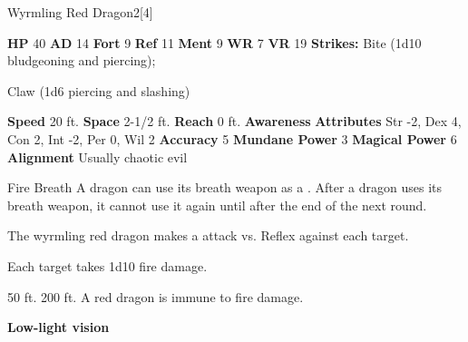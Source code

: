       
  \begin{monsubsection}{Wyrmling Red Dragon}{2}[4]
    \vspace{-1em}\vspace{-1em}
    \vspace{0em}

    
    

    \begin{spellcontent}
      \begin{spelltargetinginfo}
        \pari \textbf{HP} 40 \monsep
          \textbf{AD} 14 \monsep
          \textbf{Fort} 9 \monsep
          \textbf{Ref} 11 \monsep
          \textbf{Ment} 9
        \pari \textbf{WR} 7 \monsep
        \textbf{VR} 19
        \pari \textbf{Strikes:}
            Bite  (1d10 bludgeoning and piercing);
\par Claw  (1d6 piercing and slashing)
      \end{spelltargetinginfo}
    \end{spellcontent}
    \begin{monsterfooter}
      \pari \textbf{Speed} 20 ft. \monsep
        \textbf{Space} 2-1/2 ft. \monsep
        \textbf{Reach} 0 ft.
      \pari \textbf{Awareness} 
      \pari \textbf{Attributes}
        Str -2, Dex 4,
        Con 2, Int -2,
        Per 0, Wil 2
      \pari \textbf{Accuracy} 5 \monsep
        \textbf{Mundane Power} 3 \monsep
      \textbf{Magical Power} 6
      \pari \textbf{Alignment} Usually chaotic evil
    \end{monsterfooter}
  \end{monsubsection}
  \begin{freeability}{Fire Breath}
      A dragon can use its breath weapon as a .
      After a dragon uses its breath weapon, it cannot use it again until after the end of the next round.
      \par The wyrmling red dragon makes a  attack
        vs. Reflex against each target.
    
    \hit Each target takes 1d10 fire damage.
    \end{freeability}
  
      
       50 ft.
     200 ft.
     A red dragon is immune to fire damage.
    \par\noindent\textbf{Low-light vision}
  

